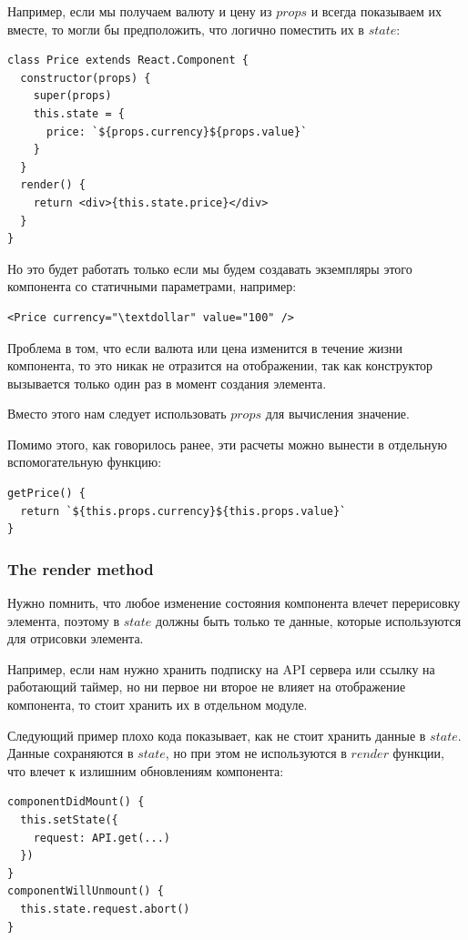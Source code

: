 Например, если мы получаем валюту и цену из $props$ и всегда показываем их вместе, то могли бы предположить, что логично поместить их в $state$:

\begin{lstlisting}
class Price extends React.Component {
  constructor(props) {
    super(props)
    this.state = {
      price: `${props.currency}${props.value}`
    } 
  }
  render() {
    return <div>{this.state.price}</div>
  }
}
\end{lstlisting}

Но это будет работать только если мы будем создавать экземпляры этого компонента со статичными параметрами, например:

\begin{lstlisting}
<Price currency="\textdollar" value="100" /> 
\end{lstlisting}

Проблема в том, что если валюта или цена изменится в течение жизни компонента, то это никак не отразится на отображении, так как конструктор вызывается только один раз в момент создания элемента.

Вместо этого нам следует использовать $props$ для вычисления значение.

Помимо этого, как говорилось ранее, эти расчеты можно вынести в отдельную вспомогательную функцию:

\begin{lstlisting}
getPrice() {
  return `${this.props.currency}${this.props.value}`
}
\end{lstlisting}

\subsubsection*{The render method}

Нужно помнить, что любое изменение состояния компонента влечет перерисовку элемента, поэтому в $state$ должны быть только те данные, которые используются для отрисовки элемента.

Например, если нам нужно хранить подписку на API сервера или ссылку на работающий таймер, но ни первое ни второе не влияет на отображение компонента, то стоит хранить их в отдельном модуле.

Следующий пример плохо кода показывает, как не стоит хранить данные в $state$. Данные сохраняются в $state$, но при этом не используются в $render$ функции, что влечет к излишним обновлениям компонента:

\begin{lstlisting}
componentDidMount() {
  this.setState({
    request: API.get(...)
  })
}
componentWillUnmount() {
  this.state.request.abort()
}
\end{lstlisting}

